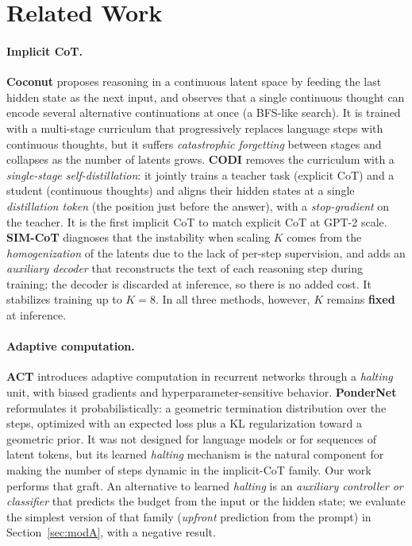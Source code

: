 \documentclass[11pt]{article}
\begin{document}
\section{Related Work}

\paragraph{Implicit CoT.} \textbf{Coconut} \citep{hao2024coconut} proposes reasoning in a continuous latent space by feeding the last hidden state as the next input, and observes that a single continuous thought can encode several alternative continuations at once (a BFS-like search). It is trained with a multi-stage curriculum that progressively replaces language steps with continuous thoughts, but it suffers \emph{catastrophic forgetting} between stages and collapses as the number of latents grows. \textbf{CODI} \citep{shen2025codi} removes the curriculum with a \emph{single-stage self-distillation}: it jointly trains a teacher task (explicit CoT) and a student (continuous thoughts) and aligns their hidden states at a single \emph{distillation token} (the position just before the answer), with a \textit{stop-gradient} on the teacher. It is the first implicit CoT to match explicit CoT at GPT-2 scale. \textbf{SIM-CoT} \citep{wei2025simcot} diagnoses that the instability when scaling $K$ comes from the \emph{homogenization} of the latents due to the lack of per-step supervision, and adds an \emph{auxiliary decoder} that reconstructs the text of each reasoning step during training; the decoder is discarded at inference, so there is no added cost. It stabilizes training up to $K=8$. In all three methods, however, $K$ remains \textbf{fixed} at inference.

\paragraph{Adaptive computation.} \textbf{ACT} \citep{graves2016act} introduces adaptive computation in recurrent networks through a \textit{halting} unit, with biased gradients and hyperparameter-sensitive behavior. \textbf{PonderNet} \citep{banino2021pondernet} reformulates it probabilistically: a geometric termination distribution over the steps, optimized with an expected loss plus a KL regularization toward a geometric prior. It was not designed for language models or for sequences of latent tokens, but its learned \textit{halting} mechanism is the natural component for making the number of steps dynamic in the implicit-CoT family. Our work performs that graft. An alternative to learned \textit{halting} is an \emph{auxiliary controller or classifier} that predicts the budget from the input or the hidden state; we evaluate the simplest version of that family (\textit{upfront} prediction from the prompt) in Section~\ref{sec:modA}, with a negative result.
\end{document}
